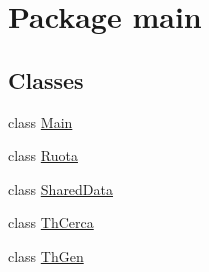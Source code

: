 \hypertarget{namespacemain}{}\section{Package main}
\label{namespacemain}
\subsection*{Classes}
\begin{DoxyCompactItemize}
\item 
class \mbox{\hyperlink{classmain_1_1_main}{Main}}
\item 
class \mbox{\hyperlink{classmain_1_1_ruota}{Ruota}}
\item 
class \mbox{\hyperlink{classmain_1_1_shared_data}{Shared\+Data}}
\item 
class \mbox{\hyperlink{classmain_1_1_th_cerca}{Th\+Cerca}}
\item 
class \mbox{\hyperlink{classmain_1_1_th_gen}{Th\+Gen}}
\end{DoxyCompactItemize}
